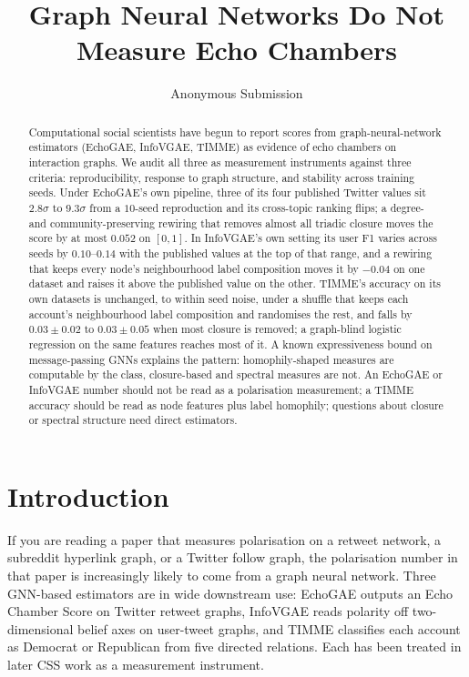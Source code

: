 \documentclass[letterpaper]{article} %
\title{Graph Neural Networks Do Not\\
Measure Echo Chambers}
\author{Anonymous Submission}
\begin{document}
\maketitle

\begin{abstract}
Computational social scientists have begun to report scores from
graph-neural-network estimators (EchoGAE, InfoVGAE, TIMME) as
evidence of echo chambers on interaction graphs. We audit all
three as measurement instruments against three criteria:
reproducibility, response to graph structure, and stability
across training seeds. Under EchoGAE's own pipeline, three of
its four published Twitter values sit $2.8\sigma$ to $9.3\sigma$
from a $10$-seed reproduction and its cross-topic ranking flips;
a degree- and community-preserving rewiring that removes almost
all triadic closure moves the score by at most $0.052$ on
$[0, 1]$. In InfoVGAE's own setting its user F1 varies across
seeds by $0.10$--$0.14$ with the published values at the top of
that range, and a rewiring that keeps every node's neighbourhood
label composition moves it by $-0.04$ on one dataset and
raises it above the published value on the other. TIMME's
accuracy on its own datasets is unchanged, to within seed
noise, under a shuffle that keeps each account's neighbourhood
label composition and randomises the rest, and falls by
$0.03 \pm 0.02$ to $0.03 \pm 0.05$ when most closure is
removed; a graph-blind logistic regression on the same features
reaches most of it. A
known expressiveness bound on message-passing GNNs explains the
pattern: homophily-shaped measures are computable by the class,
closure-based and spectral measures are not. An EchoGAE or
InfoVGAE number should not be read as a polarisation
measurement; a TIMME accuracy should be read as node features
plus label homophily; questions about closure or spectral
structure need direct estimators.
\end{abstract}

\section{Introduction}\label{sec:intro}

If you are reading a paper that measures polarisation on a
retweet network, a subreddit hyperlink graph, or a Twitter
follow graph, the polarisation number in that paper is
increasingly likely to come from a graph neural network. Three
GNN-based estimators are in wide downstream use: EchoGAE
\citep{Alatawi23EchoGAE} outputs an Echo Chamber Score on
Twitter retweet graphs, InfoVGAE \citep{Li22InfoVGAE} reads
polarity off two-dimensional belief axes on user-tweet graphs,
and TIMME \citep{XiaoTIMME2020} classifies each account as
Democrat or Republican from five directed relations. Each has
been treated in later CSS work as a measurement instrument.
\end{document}
